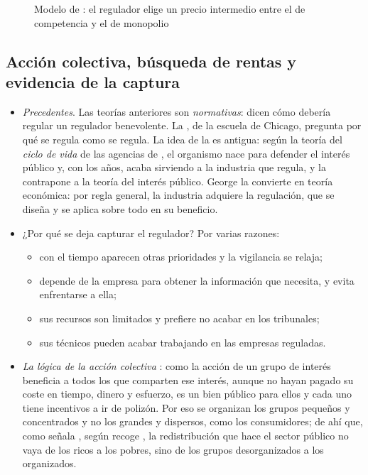 \documentclass[11pt]{article}
\begin{document}
\begin{figure}[H]
\centering
\caption{Modelo de : el regulador elige un precio intermedio entre el de competencia y el de monopolio}\label{fig:peltzman}
\end{figure}

\subsection{Acción colectiva, búsqueda de rentas y evidencia de la captura}\label{anexo:captura-evidencia}

\begin{itemize}
\item \emph{Precedentes}. Las teorías anteriores son \emph{normativas}: dicen cómo debería regular un regulador benevolente. La , de la escuela de Chicago, pregunta por qué se regula como se regula\nocite{DenHertog2000General,DenHertog2010Review}. La idea de la  es antigua: según la teoría del \emph{ciclo de vida} de las agencias de \textcite{Bernstein1955Regulating}, el organismo nace para defender el interés público y, con los años, acaba sirviendo a la industria que regula, y \textcite{Posner1974Theories} la contrapone a la teoría del interés público. George \textcite{Stigler1971Theory} la convierte en teoría económica: por regla general, la industria adquiere la regulación, que se diseña y se aplica sobre todo en su beneficio.
\item ¿Por qué se deja capturar el regulador? Por varias razones:
  \begin{itemize}
  \item con el tiempo aparecen otras prioridades y la vigilancia se relaja;
  \item depende de la empresa para obtener la información que necesita, y evita enfrentarse a ella;
  \item sus recursos son limitados y prefiere no acabar en los tribunales;
  \item sus técnicos pueden acabar trabajando en las empresas reguladas.
  \end{itemize}
\item \emph{La lógica de la acción colectiva} \parencite{Olson1965Logic}: como la acción de un grupo de interés beneficia a todos los que comparten ese interés, aunque no hayan pagado su coste en tiempo, dinero y esfuerzo, es un bien público para ellos y cada uno tiene incentivos a ir de polizón. Por eso se organizan los grupos pequeños y concentrados y no los grandes y dispersos, como los consumidores; de ahí que, como señala , según recoge \textcite{RodriguezHerrera2014Platos}, la redistribución que hace el sector público no vaya de los ricos a los pobres, sino de los grupos desorganizados a los organizados.

\end{itemize}
\end{document}
